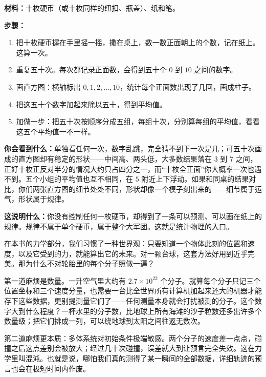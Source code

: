 
\begin{experiment}[硬币大军]
\textbf{材料：}十枚硬币（或十枚同样的纽扣、瓶盖）、纸和笔。

\textbf{步骤：}
\begin{enumerate}[itemsep=2pt]
  \item 把十枚硬币握在手里摇一摇，撒在桌上，数一数正面朝上的个数，记在纸上。这算一次。
  \item 重复五十次。每次都记录正面数，会得到五十个 \(0\) 到 \(10\) 之间的数字。
  \item 画直方图：横轴标出 \(0,1,2,\dots,10\)，统计每个正面数出现了几回，画成柱子。
  \item 把这五十个数字加起来除以五十，得到平均值。
  \item 加做一步：把五十次按顺序分成五组，每组十次，分别算每组的平均值，看看这五个平均值一不一样。
\end{enumerate}

\textbf{你会看到什么：}单独看任何一次，数字乱跳，完全猜不到下一次是几；可五十次画成的直方图却有稳定的形状——中间高、两头低，大多数结果落在 \(3\) 到 \(7\) 之间，正好十枚正反对半分的情况大约只占四分之一，而“十枚全正面”你大概率一次也遇不到。五个小组的平均值也互不相同，在 \(5\) 附近上下浮动。如果和同桌的结果对比，你们两张直方图的细节处处不同，形状却像一个模子刻出来的——细节属于运气，形状属于规律。

\textbf{这说明什么：}你没有控制任何一枚硬币，却得到了一条可以预测、可以画在纸上的规律。规律不属于单个硬币，属于整个大军团。这就是统计物理的入口。
\end{experiment}


在本书的力学部分，我们习惯了一种世界观：只要知道一个物体此刻的位置和速度，以及它受到的力，就能算出它的未来。对一颗台球，这套方法好用到近乎完美。那为什么不对轮胎里的每个分子照做一遍？

第一道麻烦是数量。一升空气里大约有 \(2.7\times10^{22}\) 个分子。就算每个分子只记三个位置坐标和三个速度分量，也需要一台比全世界所有计算机加起来还大的机器才能存下这些数据，更别提测量它们了——任何测量本身就会打扰被测的分子。这个数字大到什么程度？一杯水里的分子数，比地球上所有海滩的沙子粒数还多出许多个数量级；把它们排成一列，可以绕地球到太阳之间往返无数次。

第二道麻烦更本质：多体系统对初始条件极端敏感。两个分子的速度差一点点，碰撞之后这点差别会被放大；经过几十次碰撞，误差就大到让预言完全失效。这在力学里叫混沌。也就是说，哪怕我们真的测得了某一瞬间的全部数据，详细轨迹的预言也会在极短时间内作废。

